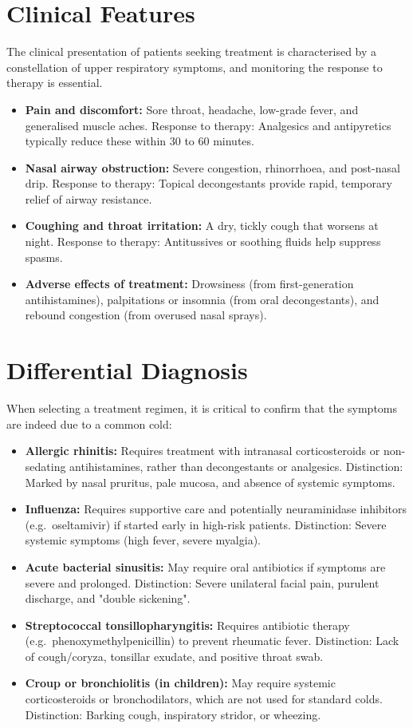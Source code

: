 \section*{Clinical Features}
The clinical presentation of patients seeking treatment is characterised by a constellation of upper respiratory symptoms, and monitoring the response to therapy is essential.
\begin{itemize}
    \item \textbf{Pain and discomfort:} Sore throat, headache, low-grade fever, and generalised muscle aches. Response to therapy: Analgesics and antipyretics typically reduce these within 30 to 60 minutes.
    \item \textbf{Nasal airway obstruction:} Severe congestion, rhinorrhoea, and post-nasal drip. Response to therapy: Topical decongestants provide rapid, temporary relief of airway resistance.
    \item \textbf{Coughing and throat irritation:} A dry, tickly cough that worsens at night. Response to therapy: Antitussives or soothing fluids help suppress spasms.
    \item \textbf{Adverse effects of treatment:} Drowsiness (from first-generation antihistamines), palpitations or insomnia (from oral decongestants), and rebound congestion (from overused nasal sprays).
\end{itemize}

\section*{Differential Diagnosis}
When selecting a treatment regimen, it is critical to confirm that the symptoms are indeed due to a common cold:
\begin{itemize}
    \item \textbf{Allergic rhinitis:} Requires treatment with intranasal corticosteroids or non-sedating antihistamines, rather than decongestants or analgesics. Distinction: Marked by nasal pruritus, pale mucosa, and absence of systemic symptoms.
    \item \textbf{Influenza:} Requires supportive care and potentially neuraminidase inhibitors (e.g.\ oseltamivir) if started early in high-risk patients. Distinction: Severe systemic symptoms (high fever, severe myalgia).
    \item \textbf{Acute bacterial sinusitis:} May require oral antibiotics if symptoms are severe and prolonged. Distinction: Severe unilateral facial pain, purulent discharge, and "double sickening".
    \item \textbf{Streptococcal tonsillopharyngitis:} Requires antibiotic therapy (e.g.\ phenoxymethylpenicillin) to prevent rheumatic fever. Distinction: Lack of cough/coryza, tonsillar exudate, and positive throat swab.
    \item \textbf{Croup or bronchiolitis (in children):} May require systemic corticosteroids or bronchodilators, which are not used for standard colds. Distinction: Barking cough, inspiratory stridor, or wheezing.
\end{itemize}

